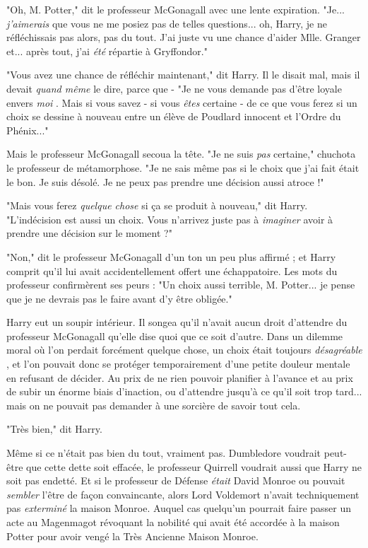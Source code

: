 "Oh, M. Potter," dit le professeur McGonagall avec une lente expiration. "Je... \emph{j'aimerais}  que vous ne me posiez pas de telles questions... oh, Harry, je ne réfléchissais pas alors, pas du tout. J'ai juste vu une chance d'aider Mlle. Granger et... après tout, j'ai \emph{été}  répartie à Gryffondor."

"Vous avez une chance de réfléchir maintenant," dit Harry. Il le disait mal, mais il devait \emph{quand même } le dire, parce que - "Je ne vous demande pas d'être loyale envers \emph{moi} . Mais si vous savez - si vous \emph{êtes}  certaine - de ce que vous ferez si un choix se dessine à nouveau entre un élève de Poudlard innocent et l'Ordre du Phénix..."

Mais le professeur McGonagall secoua la tête. "Je ne suis \emph{pas } certaine," chuchota le professeur de métamorphose. "Je ne sais même pas si le choix que j'ai fait était le bon. Je suis désolé. Je ne peux pas prendre une décision aussi atroce !"

"Mais vous ferez \emph{quelque chose}  si ça se produit à nouveau," dit Harry. "L'indécision est aussi un choix. Vous n'arrivez juste pas à \emph{imaginer } avoir à prendre une décision sur le moment ?"

"Non," dit le professeur McGonagall d'un ton un peu plus affirmé ; et Harry comprit qu'il lui avait accidentellement offert une échappatoire. Les mots du professeur confirmèrent ses peurs : "Un choix aussi terrible, M. Potter... je pense que je ne devrais pas le faire avant d'y être obligée."

Harry eut un soupir intérieur. Il songea qu'il n'avait aucun droit d'attendre du professeur McGonagall qu'elle dise quoi que ce soit d'autre. Dans un dilemme moral où l'on perdait forcément quelque chose, un choix était toujours \emph{désagréable} , et l'on pouvait donc se protéger temporairement d'une petite douleur mentale en refusant de décider. Au prix de ne rien pouvoir planifier à l'avance et au prix de subir un énorme biais d'inaction, ou d'attendre jusqu'à ce qu'il soit trop tard... mais on ne pouvait pas demander à une sorcière de savoir tout cela.

"Très bien," dit Harry.

Même si ce n'était pas bien du tout, vraiment pas. Dumbledore voudrait peut-être que cette dette soit effacée, le professeur Quirrell voudrait aussi que Harry ne soit pas endetté. Et si le professeur de Défense \emph{était}  David Monroe ou pouvait \emph{sembler}  l'être de façon convaincante, alors Lord Voldemort n'avait techniquement pas \emph{exterminé}  la maison Monroe. Auquel cas quelqu'un pourrait faire passer un acte au Magenmagot révoquant la nobilité qui avait été accordée à la maison Potter pour avoir vengé la Très Ancienne Maison Monroe.

